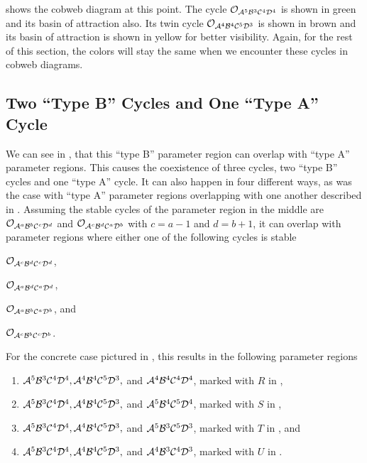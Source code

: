  shows the cobweb diagram at this point.
The cycle $\mathcal{O}_{\mathcal{A}^5\mathcal{B}^3\mathcal{C}^4\mathcal{D}^4}$ is shown in green and its basin of attraction also.
Its twin cycle $\mathcal{O}_{\mathcal{A}^4\mathcal{B}^4\mathcal{C}^5\mathcal{D}^3}$ is shown in brown and its basin of attraction is shown in yellow for better visibility.
Again, for the rest of this section, the colors will stay the same when we encounter these cycles in cobweb diagrams.

\subsection{Two ``Type B'' Cycles and One ``Type A'' Cycle}
\label{sec:arch.coex.AB}

We can see in , that this ``type B'' parameter region can overlap with ``type A'' parameter regions.
This causes the coexistence of three cycles, two ``type B'' cycles and one ``type A'' cycle.
It can also happen in four different ways, as was the case with ``type A'' parameter regions overlapping with one another described in .
Assuming the stable cycles of the parameter region in the middle are $\mathcal{O}_{\mathcal{A}^a\mathcal{B}^b\mathcal{C}^c\mathcal{D}^d}$ and $\mathcal{O}_{\mathcal{A}^c\mathcal{B}^d\mathcal{C}^a\mathcal{D}^b}$ with $c = a - 1$ and $d = b + 1$, it can overlap with parameter regions where either one of the following cycles is stable
\begin{enumerate*}
	\item $\mathcal{O}_{\mathcal{A}^c\mathcal{B}^d\mathcal{C}^c\mathcal{D}^d}$,
	\item $\mathcal{O}_{\mathcal{A}^a\mathcal{B}^d\mathcal{C}^a\mathcal{D}^d}$,
	\item $\mathcal{O}_{\mathcal{A}^a\mathcal{B}^b\mathcal{C}^a\mathcal{D}^b}$, and
	\item $\mathcal{O}_{\mathcal{A}^c\mathcal{B}^b\mathcal{C}^c\mathcal{D}^b}$.
\end{enumerate*}
For the concrete case pictured in , this results in the following parameter regions
\begin{enumerate}
	\item $\mathcal{A}^5\mathcal{B}^3\mathcal{C}^4\mathcal{D}^4, \mathcal{A}^4\mathcal{B}^4\mathcal{C}^5\mathcal{D}^3,$ and $\mathcal{A}^4\mathcal{B}^4\mathcal{C}^4\mathcal{D}^4$, marked with $R$ in ,
	\item $\mathcal{A}^5\mathcal{B}^3\mathcal{C}^4\mathcal{D}^4, \mathcal{A}^4\mathcal{B}^4\mathcal{C}^5\mathcal{D}^3,$ and $\mathcal{A}^5\mathcal{B}^4\mathcal{C}^5\mathcal{D}^4$, marked with $S$ in ,
	\item $\mathcal{A}^5\mathcal{B}^3\mathcal{C}^4\mathcal{D}^4, \mathcal{A}^4\mathcal{B}^4\mathcal{C}^5\mathcal{D}^3,$ and $\mathcal{A}^5\mathcal{B}^3\mathcal{C}^5\mathcal{D}^3$, marked with $T$ in , and
	\item $\mathcal{A}^5\mathcal{B}^3\mathcal{C}^4\mathcal{D}^4, \mathcal{A}^4\mathcal{B}^4\mathcal{C}^5\mathcal{D}^3,$ and $\mathcal{A}^4\mathcal{B}^3\mathcal{C}^4\mathcal{D}^3$, marked with $U$ in .
\end{enumerate}

